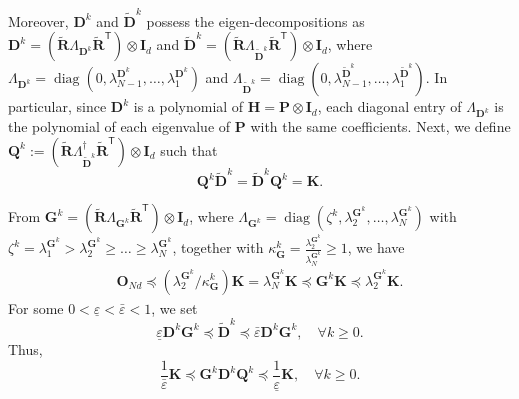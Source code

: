 \documentclass[12pt,draftcls,onecolumn]{IEEEtran}
\newcommand{\bD}{{\mathbf{D}}}
\begin{document}
Moreover, $\bD^k$ and $\tilde{\bD}^k$ possess the eigen-decompositions as $\mathbf{D}^k = (\tilde{\mathbf{R}} \Lambda_{\mathbf{D}^k} \tilde{\mathbf{R}}^{\mathsf{T}})\otimes \mathbf{I}_d$ and $\tilde{\bD}^k = (\tilde{\mathbf{R}} \Lambda_{\tilde{\mathbf{D}}^k} \tilde{\mathbf{R}}^{\mathsf{T}})\otimes \mathbf{I}_d$, where $\Lambda_{\mathbf{D}^k}=\operatorname{diag}(0,\lambda_{N-1}^{\bD^k},\dots,\lambda_{1}^{\bD^k})$ and $\Lambda_{\tilde{\mathbf{D}}^k}=\operatorname{diag}(0,\lambda_{N-1}^{\tilde{\bD}^k},\dots,\lambda_{1}^{\tilde{\bD}^k})$. In particular, since $\mathbf{D}^k$ is a polynomial of $\mathbf{H}=\mathbf{P}\otimes \mathbf{I}_{d}$, each diagonal entry of $\Lambda_{\mathbf{D}^k}$ is the polynomial of each eigenvalue of $\mathbf{P}$ with the same coefficients. Next, we define $\mathbf{Q}^k := (\tilde{\mathbf{R}} \Lambda _{\tilde{\mathbf{D}}^k} ^{\dagger} \tilde{\mathbf{R}}^{\mathsf{T}}) \otimes \mathbf{I}_d$ such that 
\begin{equation}
	\mathbf{Q}^k \tilde{\mathbf{D}}^k = \tilde{\mathbf{D}}^k \mathbf{Q}^k= \mathbf{K}. \label{QktildeDk=tildeDkQk}
\end{equation}

From $\mathbf{G}^k = (\tilde{\mathbf{R}}\Lambda_{\mathbf{G}^k}\tilde{\mathbf{R}}^{\mathsf{T}}) \otimes \mathbf{I}_{d}$, where $\Lambda_{\mathbf{G}^k} = \operatorname{diag}({\zeta^k}, \lambda_2^{\mathbf{G}^k}, \dots, \lambda_N^{\mathbf{G}^k})$ with $\zeta^k=\lambda_1^{\mathbf{G}^k}>\lambda_2^{\mathbf{G}^k} \geq \dots\geq\lambda_N^{\mathbf{G}^k}$, together with ${\kappa_{\mathbf{G}}^k} = \frac{\lambda_{2}^{\mathbf{G}^k}}{\lambda_{N}^{\mathbf{G}^k}}\geq 1$, we have
\begin{align}
	\mathbf{O}_{Nd} \preceq (\lambda_{2}^{\mathbf{G}^k}/\kappa_{\mathbf{G}}^k)\mathbf{K} = \lambda_{N}^{\mathbf{G}^k}\mathbf{K} \preceq \mathbf{G}^k \mathbf{K} \preceq \lambda_{2}^{\mathbf{G}^k}\mathbf{K}. \label{Gk range}
\end{align}
For some $0<\underline{\varepsilon}<\bar{\varepsilon}<1$, we set
\begin{equation}
	\underline{\varepsilon}\mathbf{D}^k\mathbf{G}^k\preceq\tilde{\mathbf{D}}^k \preceq \bar{\varepsilon}\mathbf{D}^k\mathbf{G}^k, \quad \forall k \geq 0. \label{tildeD range}
\end{equation}
Thus,
\begin{equation}
	\frac{1}{\bar{\varepsilon}}\mathbf{K}\preceq\mathbf{G}^k\mathbf{D}^k\mathbf{Q}^k \preceq \frac{1}{\underline{\varepsilon}}\mathbf{K}, \quad \forall k\geq 0. \label{GkDkQk}
\end{equation}
\end{document}
